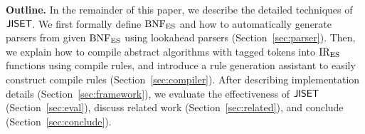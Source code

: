 \smallskip

\textbf{Outline.}
In the remainder of this paper, we describe the detailed techniques of
\( \text{\sf JISET} \).  We first formally define \( \text{BNF}_{\text{ES}} \) and how to
automatically generate parsers from given \( \text{BNF}_{\text{ES}} \) using lookahead
parsers (Section~\ref{sec:parser}).  Then, we explain how to compile
abstract algorithms with tagged tokens into \( \text{IR}_\text{ES} \) functions using
compile rules, and introduce a rule generation assistant to
easily construct compile rules (Section~\ref{sec:compiler}).  After
describing implementation details (Section~\ref{sec:framework}),
we evaluate the effectiveness of \( \text{\sf JISET} \)
(Section~\ref{sec:eval}), discuss related work
(Section~\ref{sec:related}), and conclude (Section~\ref{sec:conclude}).
